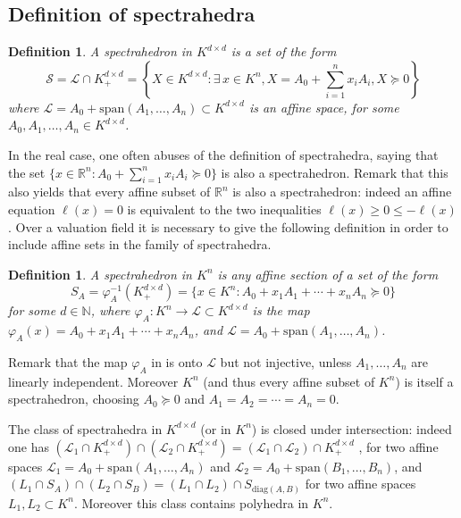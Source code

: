 \documentclass[a4paper,oneside,11pt]{article}
\newtheorem{definition}[theorem]{Definition}
\renewcommand{\span}[1]{{\text{span}(#1)}} %
\def\diag{\mathrm{diag}}
\begin{document}
\subsection{Definition of spectrahedra}

\begin{definition}
  \label{def_spectrahedra}
  A \emph{spectrahedron in $K^{d\times d}$} is a set of the form
  $$
  \mathcal{S} = \mathcal{L} \cap K^{d\times d}_+ = \left\{X \in K^{d \times d} :
  \exists \, x \in K^n, X = A_0 + \sum_{i=1}^n x_i A_i, X \succeq 0\right\}
  $$
  where $\mathcal{L} = A_0+\span{A_1,\ldots,A_n} \subset K^{d \times d}$ is an affine space, for some
  $A_0,A_1,\ldots,A_n \in K^{d\times d}$.
\end{definition}

In the real case, one often abuses of the definition of spectrahedra, saying that the set
$\{x \in \mathbb{R}^n : A_0+\sum_{i=1}^n x_iA_i \succeq 0\}$ is also a spectrahedron.
Remark that this also yields that every affine subset of $\mathbb{R}^n$ is also
a spectrahedron: indeed an affine equation $\ell(x) = 0$ is equivalent to the two inequalities
$\ell(x) \geq 0 \leq -\ell(x)$. Over a valuation field it is necessary to give the following
definition in order to include affine sets in the family of spectrahedra.

\begin{definition}
  \label{def_spectrahedra_Kn}
  A \emph{spectrahedron in $K^n$} is any affine section of a set of the form
  $$
  S_A = \varphi_A^{-1}(K^{d \times d}_+) = \{x \in K^n : A_0+x_1A_1+\cdots+x_nA_n \succeq 0\}
  $$
  for some $d\in \mathbb{N}$,
  where $\varphi_A : K^n \to \mathcal{L} \subset K^{d \times d}$ is the map
  $\varphi_A(x) = A_0+x_1A_1+\cdots+x_nA_n$, and $\mathcal{L} = A_0+\span{A_1,\ldots,A_n}$.
\end{definition}

Remark that the map $\varphi_A$ in  is onto $\mathcal{L}$ but not
injective, unless $A_1,\ldots,A_n$ are linearly independent. Moreover $K^n$ (and thus every affine
subset of $K^n$) is itself a spectrahedron, choosing $A_0 \succeq 0$ and $A_1=A_2=\cdots=A_n=0$.

The class of spectrahedra in $K^{d \times d}$ (or in $K^n$) is closed under intersection: indeed one
has $(\mathcal{L}_1 \cap K^{d \times d}_+) \cap (\mathcal{L}_2 \cap K^{d \times d}_+) =
(\mathcal{L}_1 \cap \mathcal{L}_2) \cap K^{d \times d}_+$
, for two affine spaces
$\mathcal{L}_1 = A_0+\span{A_1,\ldots,A_n}$ and $\mathcal{L}_2 = A_0+\span{B_1,\ldots,B_n}$,
and
$(L_1 \cap S_A) \cap (L_2 \cap S_B) = (L_1\cap L_2) \cap S_{\diag(A,B)}$ for
two affine spaces $L_1,L_2 \subset K^n$.
Moreover this class contains polyhedra in $K^n$.
\end{document}
